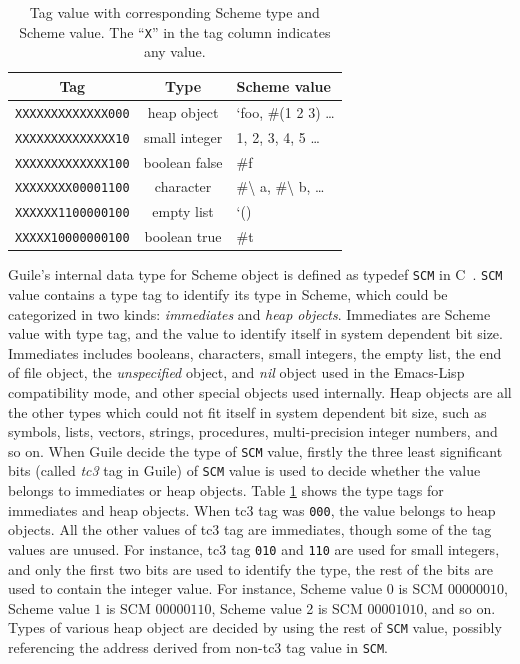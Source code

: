 \documentclass[preprint, 10pt]{sigplanconf}
\begin{document}
\begin{table}
  \begin{center}
  \begin{tabular}{ccl}
    \toprule
    Tag&Type&Scheme value\\
    \midrule
    \texttt{XXXXXXXXXXXXX000} & heap object & `foo, \#(1 2 3) \ldots \\
    \texttt{XXXXXXXXXXXXXX10} & small integer & 1, 2, 3, 4, 5 \ldots \\
    \texttt{XXXXXXXXXXXXX100} & boolean false & \#f \\
    \texttt{XXXXXXXX00001100} & character & \#\textbackslash{} a,
    \#\textbackslash{} b, \ldots \\
    \texttt{XXXXXX1100000100} & empty list & `() \\
    \texttt{XXXXX10000000100} & boolean true & \#t \\
    \bottomrule
  \end{tabular}
  \end{center}
  \caption{Tag value with corresponding Scheme type and Scheme value. The
    ``\texttt{X}'' in the tag column indicates any value.}
\label{tab:tags}
\end{table}

Guile's internal data type for Scheme object is defined as typedef \texttt{SCM}
in C~\cite{Galassi02guilereference}. \texttt{SCM} value contains a type tag to
identify its type in Scheme, which could be categorized in two kinds:
\textit{immediates} and \textit{heap objects}. Immediates are Scheme value with
type tag, and the value to identify itself in system dependent bit
size. Immediates includes booleans, characters, small integers, the empty list,
the end of file object, the \textit{unspecified} object, and \textit{nil} object
used in the Emacs-Lisp compatibility mode, and other special objects used
internally. Heap objects are all the other types which could not fit itself in
system dependent bit size, such as symbols, lists, vectors, strings, procedures,
multi-precision integer numbers, and so on.  When Guile decide the type of
\texttt{SCM} value, firstly the three least significant bits (called
\textit{tc3} tag in Guile) of \texttt{SCM} value is used to decide whether the
value belongs to immediates or heap objects. Table
\hyperref[tab:tags]{\ref{tab:tags}} shows the type tags for immediates and heap
objects. When tc3 tag was \texttt{000}, the value belongs to heap objects. All
the other values of tc3 tag are immediates, though some of the tag values are
unused. For instance, tc3 tag \texttt{010} and \texttt{110} are used for small
integers, and only the first two bits are used to identify the type, the rest of
the bits are used to contain the integer value. For instance, Scheme value $0$
is SCM $00000010$, Scheme value $1$ is SCM $00000110$, Scheme value 2 is SCM
$00001010$, and so on. Types of various heap object are decided by using the
rest of \texttt{SCM} value, possibly referencing the address derived from
non-tc3 tag value in \texttt{SCM}.
\end{document}
